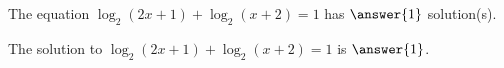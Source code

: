 \documentclass{ximera}
\author{Kenneth Berglund}
\begin{document}
\licenseSZ
\begin{exercise}
The equation $\log_2(2x + 1) + \log_2(x + 2) = 1$ has $\answer{1}$ solution(s).

\begin{exercise}
The solution to $\log_2(2x + 1) + \log_2(x + 2) = 1$ is $\answer{1}$.
\end{exercise}

\end{exercise}
\end{document}
